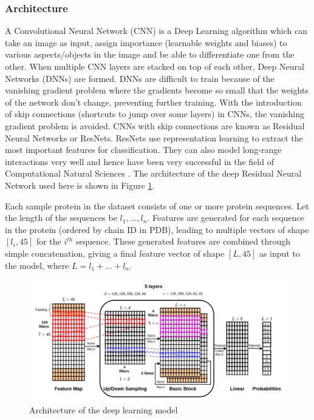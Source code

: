 \documentclass[journal=jacsat,manuscript=article]{achemso}
\begin{document}
\subsubsection{Architecture}
\quad A Convolutional Neural Network (CNN) is a Deep Learning algorithm which can take an image as input, assign importance (learnable weights and biases) to various aspects/objects in the image and be able to differentiate one from the other. When multiple CNN layers are stacked on top of each other, Deep Neural Networks (DNNs) are formed. DNNs are difficult to train because of the vanishing gradient problem where the gradients become so small that the weights of the network don't change, preventing further training. With the introduction of skip connections (shortcuts to jump over some layers) in CNNs, the vanishing gradient problem is avoided. CNNs with skip connections are known as Residual Neural Networks or ResNets. ResNets use representation learning to extract the most important features for classification. They can also model long-range interactions very well and hence have been very successful in the field of Computational Natural Sciences \cite{senior2020improved}.  The architecture of the deep Residual Neural Network used here is shown in Figure \ref{fig:architecture}.

Each sample protein in the dataset consists of one or more protein sequences. Let the length of the sequences be $l_1, ..., l_n$. Features are generated for each sequence in the protein (ordered by chain ID in PDB), leading to multiple vectors of shape $[l_i, 45]$ for the $i^{th}$ sequence. These generated features are combined through simple concatenation, giving a final feature vector of shape $[L, 45]$ as input to the model, where $L = l_1 + ... + l_n$.

\begin{figure}
    \centering
    \noindent\includegraphics[scale=0.5]{architecture}
    \caption{\centering Architecture of the deep learning model}
    \label{fig:architecture}
\end{figure}
\end{document}
